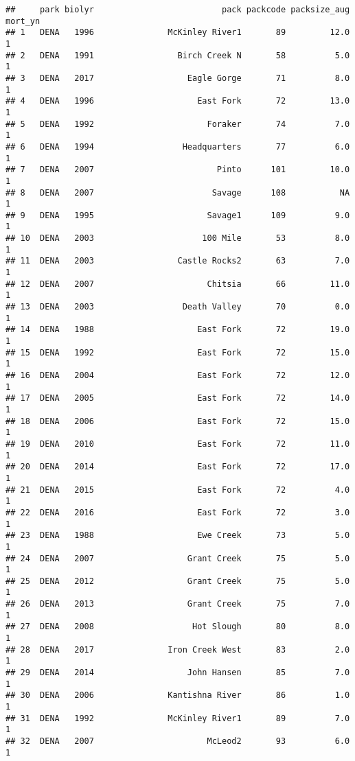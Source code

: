 \documentclass[
]{article}
\begin{document}
\begin{verbatim}
##     park biolyr                          pack packcode packsize_aug mort_yn
## 1   DENA   1996               McKinley River1       89         12.0       1
## 2   DENA   1991                 Birch Creek N       58          5.0       1
## 3   DENA   2017                   Eagle Gorge       71          8.0       1
## 4   DENA   1996                     East Fork       72         13.0       1
## 5   DENA   1992                       Foraker       74          7.0       1
## 6   DENA   1994                  Headquarters       77          6.0       1
## 7   DENA   2007                         Pinto      101         10.0       1
## 8   DENA   2007                        Savage      108           NA       1
## 9   DENA   1995                       Savage1      109          9.0       1
## 10  DENA   2003                      100 Mile       53          8.0       1
## 11  DENA   2003                 Castle Rocks2       63          7.0       1
## 12  DENA   2007                       Chitsia       66         11.0       1
## 13  DENA   2003                  Death Valley       70          0.0       1
## 14  DENA   1988                     East Fork       72         19.0       1
## 15  DENA   1992                     East Fork       72         15.0       1
## 16  DENA   2004                     East Fork       72         12.0       1
## 17  DENA   2005                     East Fork       72         14.0       1
## 18  DENA   2006                     East Fork       72         15.0       1
## 19  DENA   2010                     East Fork       72         11.0       1
## 20  DENA   2014                     East Fork       72         17.0       1
## 21  DENA   2015                     East Fork       72          4.0       1
## 22  DENA   2016                     East Fork       72          3.0       1
## 23  DENA   1988                     Ewe Creek       73          5.0       1
## 24  DENA   2007                   Grant Creek       75          5.0       1
## 25  DENA   2012                   Grant Creek       75          5.0       1
## 26  DENA   2013                   Grant Creek       75          7.0       1
## 27  DENA   2008                    Hot Slough       80          8.0       1
## 28  DENA   2017               Iron Creek West       83          2.0       1
## 29  DENA   2014                   John Hansen       85          7.0       1
## 30  DENA   2006               Kantishna River       86          1.0       1
## 31  DENA   1992               McKinley River1       89          7.0       1
## 32  DENA   2007                       McLeod2       93          6.0       1

\end{verbatim}
\end{document}

